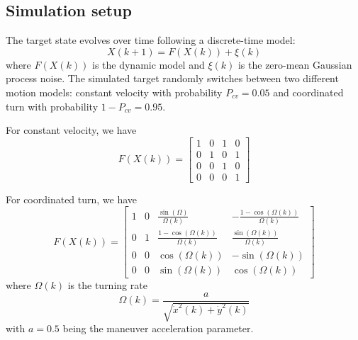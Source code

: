 \documentclass[10pt,letterpaper,final]{article}
\begin{document}
\subsection{Simulation setup}

The target state evolves over time following a discrete-time model:
\begin{equation}
X(k+1) = F(X(k))+\xi(k)
\end{equation}
where $F(X(k))$ is the dynamic model and $\xi(k)$ is the zero-mean Gaussian process noise. The simulated target randomly switches between two different motion models: constant velocity with probability $P_{cv} = 0.05$ and coordinated turn with probability $1-P_{cv}=0.95$. 

For constant velocity, we have
\begin{equation}
F(X(k)) = 
\left[
\begin{array}{cccc}
1 & 0 & 1 & 0 \\
0 & 1 & 0 & 1 \\
0 & 0 & 1 & 0 \\
0 & 0 & 0 & 1
\end{array}
\right]
\end{equation}

For coordinated turn, we have 
\begin{equation}
F(X(k)) = 
\left[
\begin{array}{cccc}
1 & 0 & \frac{\sin(\Omega)}{\Omega (k)} & -\frac{1-\cos(\Omega (k))}{\Omega (k)} \\
0 & 1 & \frac{1-\cos(\Omega (k))}{\Omega (k)} & \frac{\sin(\Omega (k))}{\Omega (k)} \\
0 & 0 & \cos(\Omega (k)) & -\sin(\Omega (k)) \\
0 & 0 & \sin(\Omega (k)) & \cos(\Omega (k)) 
\end{array}
\right]
\end{equation}
where $\Omega (k)$ is the turning rate
\begin{equation}
\Omega (k) = \frac{a}{\sqrt{\dot{x}^2(k)+\dot{y}^2(k)}}
\end{equation}
with $a=0.5$ being the maneuver acceleration parameter. 
\end{document}
